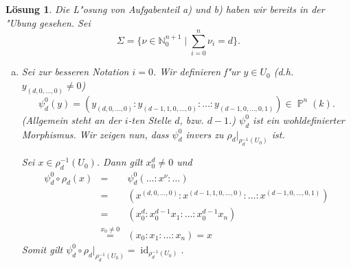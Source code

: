 \documentclass[a4paper, 12pt, numbers=noendperiod, chapterprefix=true]{scrbook}
\theoremstyle{break}
\newtheorem{Loes}{L\"osung}
\theoremstyle{nonumberbreak}
\theoremstyle{nonumberplain}
\newcommand{\set}[2]{\{#1\mid #2\}} %
\DeclareMathOperator{\id}{id}
\newcommand{\N}{\mathbb{N}}
\newcommand{\A}{\mathbb{A}}
\DeclareMathOperator{\Projective}{\mathbb{P}} %
\begin{document}
\begin{Loes}
Die L"osung von Aufgabenteil a) und b) haben wir bereits in der "Ubung gesehen. Sei
	\[\Sigma = \set{\nu \in \N_0^{n+1}}{\sum_{i=0}^n \nu_i = d}.\]
\begin{enumerate}[a)]
\item[c)]
	Sei zur besseren Notation $i=0$. Wir definieren f"ur $y\in U_0$ (d.h. $y_{(d,0,\dots,0)} \neq 0$)
		\[\psi_d^0(y) = (y_{(d,0,\dots,0)}: y_{(d-1,1,0,\dots,0)} : \ldots : y_{(d-1,0,\dots,0,1)}) \in \Projective^n(k).\]
	(Allgemein steht an der $i$-ten Stelle $d$, bzw. $d-1$.) $\psi_d^0$ ist ein wohldefinierter Morphismus. Wir zeigen nun, dass $\psi_d^0$ invers zu $\rho_d|_{\rho_d^{-1}(U_0)}$ ist. 

	Sei $x\in \rho_d^{-1}(U_0)$. Dann gilt $x_0^d\neq 0$ und 
	\begin{eqnarray*}
		\psi_d^0 \circ \rho_d(x) &=& \psi_d^0(\ldots : x^\nu : \ldots)\\
		&=& (x^{(d,0,\dots,0)} : x^{(d-1,1,0,\dots,0)}: \dots : x^{(d-1,0,\dots,0,1)})\\
		&=& (x_0^d: x_0^{d-1}x_1: \ldots : x_0^{d-1}x_n)\\
		&\stackrel{x_0 \neq 0}{=}& (x_0 : x_1: \ldots : x_n) = x
	\end{eqnarray*}
	Somit gilt $\psi_d^0\circ \rho_d|_{\rho_d^{-1}(U_0)} = \id_{\rho_d^{-1}(U_0)}$.


\end{enumerate}
\end{Loes}
\end{document}
